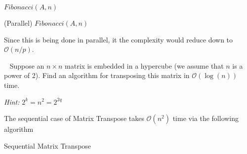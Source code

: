 \documentclass[addpoints]{exam}
\newcommand{\BigO}[1]{\mathcal{O}\left( #1\right)}
\begin{document}
\begin{questions}
\begin{solution}
\begin{algorithm}[H]
\centering
\caption{$Fibonacci(A,n)$}
\begin{algorithmic}[1]
\ELSE
\ENDIF
\end{algorithmic}
\label{alg:fib2}
\end{algorithm}

\begin{algorithm}[H]
\centering
\caption{(Parallel) $Fibonacci(A,n)$}
\begin{algorithmic}[1]
\ELSE
\ENDIF
\end{algorithmic}
\label{alg:fib2par}
\end{algorithm}

Since this is being done in parallel, it the complexity would reduce down to $\BigO{n/p}$.
\end{solution}

\ \newpage
{}
Suppose an $n\times n$ matrix is embedded in a hypercube (we assume that $n$ is a power of 2). Find an algorithm for transposing this matrix in $\BigO{\log(n)}$ time. 

{\em Hint:} $2^{k} = n^{2} = 2^{2q}$

\begin{solution}
The sequential case of Matrix Transpose takes $\BigO{n^{2}}$ time via the following algorithm

\begin{algorithm}[H]
\caption{Sequential Matrix Transpose}
\begin{algorithmic}[1]
    \ENDFOR
\ENDFOR
\end{algorithmic}
\end{algorithm}


\end{solution}
\end{questions}
\end{document}
